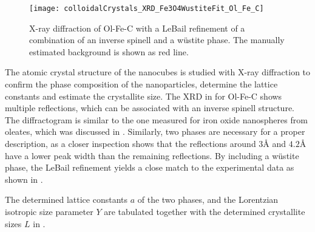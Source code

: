 \documentclass[\main/dresen_thesis.tex]{subfiles}
\begin{document}
  \label{sec:colloidalCrystals:nanoparticle:xrd}
  \begin{figure}[tb]
    \centering
    \texttt{[image: colloidalCrystals\_XRD\_Fe3O4WustiteFit\_Ol\_Fe\_C]}
    \caption{\label{fig:colloidalCrystals:nanoparticle:xrd}X-ray diffraction of Ol-Fe-C with a LeBail refinement of a combination of an inverse spinell and a w\"ustite phase. The manually estimated background is shown as red line.}
  \end{figure}
  The atomic crystal structure of the nanocubes is studied with X-ray diffraction to confirm the phase composition of the nanoparticles, determine the lattice constants and estimate the crystallite size.
  The XRD in  for Ol-Fe-C shows multiple reflections, which can be associated with an inverse spinell structure.
  The diffractogram is similar to the one measured for iron oxide nanospheres from oleates, which was discussed in .
  Similarly, two phases are necessary for a proper description, as a closer inspection shows that the reflections around $3 \unit{\angstrom}$ and $4.2 \unit{\angstrom}$ have a lower peak width than the remaining reflections.
  By including a w\"ustite phase, the LeBail refinement yields a close match to the experimental data as shown in .

  The determined lattice constants $a$ of the two phases, and the Lorentzian isotropic size parameter $Y$ are tabulated together with the determined crystallite sizes $L$ in .
\end{document}
